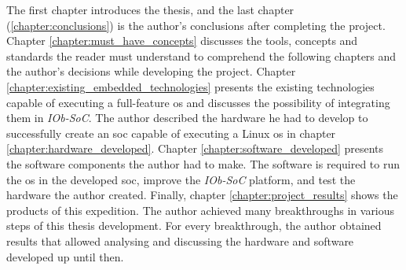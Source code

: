 The first chapter introduces the thesis, and the last chapter (\ref{chapter:conclusions}) is the author's conclusions after completing the project. Chapter \ref{chapter:must_have_concepts} discusses the tools, concepts and standards the reader must understand to comprehend the following chapters and the author's decisions while developing the project. Chapter \ref{chapter:existing_embedded_technologies} presents the existing technologies capable of executing a full-feature \acrshort{os} and discusses the possibility of integrating them in \textit{IOb-SoC}. The author described the hardware he had to develop to successfully create an \acrshort{soc} capable of executing a Linux \acrshort{os} in chapter \ref{chapter:hardware_developed}. Chapter \ref{chapter:software_developed} presents the software components the author had to make. The software is required to run the \acrshort{os} in the developed \acrshort{soc}, improve the \textit{IOb-SoC} platform, and test the hardware the author created. Finally, chapter \ref{chapter:project_results} shows the products of this expedition. The author achieved many breakthroughs in various steps of this thesis development. For every breakthrough, the author obtained results that allowed analysing and discussing the hardware and software developed up until then.
